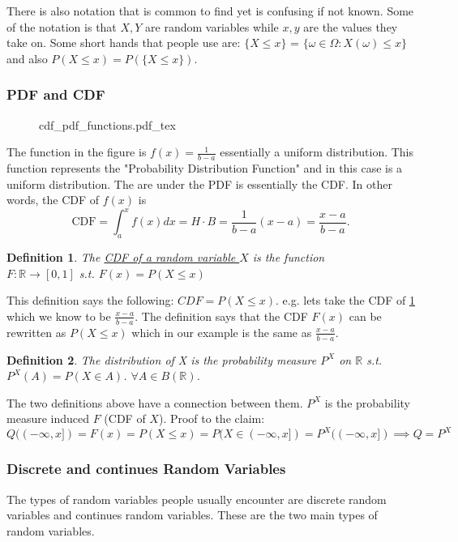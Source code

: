 \documentclass{article}
\newtheorem{definition}{Definition}
\newcommand{\incfig}[2]{
    \def\svgwidth{#2\columnwidth}
    {#1.pdf_tex}
}
\newcommand{\R}{ \mathbb{R} }
\begin{document}
There is also notation that is common to find yet is confusing if not known.
Some of the notation is that $X, Y$ are random variables while 
$x, y$ are the values they take on. Some short hands that people use are:
$\{ X \le x\} $ = $\{ \omega \in \Omega : X(\omega) \le x \}$ and also 
$P(X \le x) = P(\{X \le x\})$.

\subsubsection{PDF and CDF}
\begin{figure}[ht]
    \label{fig:pdf_cdf}
    \center
    \incfig{cdf_pdf_functions}{.4}
\end{figure}
The function in the figure is $f(x) = \frac{1}{b-a}$ essentially a uniform distribution.
This function represents the "Probability Distribution Function" and in this case is a 
uniform distribution. The are under the PDF is essentially the CDF. In other words, 
the CDF of $f(x)$ is 
\[
    \text{CDF} = \int_{a}^{x} f(x) dx = H \cdot B = \frac{1}{b-a}(x-a) = \frac{x-a}{b-a}
.\] 

\begin{definition}
    The \underline{CDF of a random variable $X$} is the function \\
    $F : \R \to [0, 1]$ s.t. $F(x) = P(X \le x)$
\end{definition}
This definition says the following: $CDF = P(X \le x)$. e.g. lets take the CDF 
of \ref{fig:pdf_cdf} which we know to be $\frac{x-a}{b-a}$. The definition says that 
the CDF $F(x)$ can be rewritten as $P(X \le x)$ which in our example is the same as  $\frac{x-a}{b-a}$.

\begin{definition}
    The distribution of X is the probability measure $P^X$ on $\R$ s.t.
    $P^X(A) = P(X \in A)$. $\forall A \in B(\R)$.
\end{definition}
The two definitions above have a connection between them.
$P^X$ is the probability measure induced $F$ (CDF of $X$).
Proof to the claim: $Q((-\infty, x]) = F(x) = P(X \le x) = P(X \in (-\infty, x]) = P^X((-\infty, x]) \implies Q=P^X$


\subsubsection{Discrete and continues Random Variables}
The types of random variables people usually encounter are discrete random variables 
and continues random variables. These are the two main types of random variables.
\end{document}
